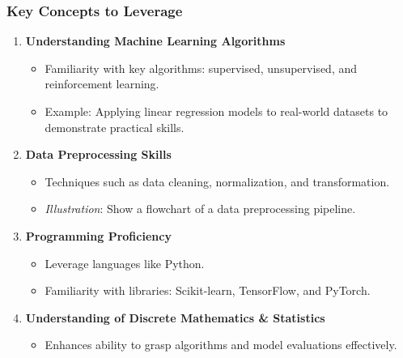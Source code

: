 \documentclass{beamer}
\begin{document}
\begin{frame}[fragile]
    \frametitle{Key Concepts to Leverage}
    \begin{enumerate}
        \item \textbf{Understanding Machine Learning Algorithms}
            \begin{itemize}
                \item Familiarity with key algorithms: supervised, unsupervised, and reinforcement learning.
                \item Example: Applying linear regression models to real-world datasets to demonstrate practical skills.
            \end{itemize}
        \item \textbf{Data Preprocessing Skills}
            \begin{itemize}
                \item Techniques such as data cleaning, normalization, and transformation.
                \item \textit{Illustration}: Show a flowchart of a data preprocessing pipeline.
            \end{itemize}
        \item \textbf{Programming Proficiency}
            \begin{itemize}
                \item Leverage languages like Python.
                \item Familiarity with libraries: Scikit-learn, TensorFlow, and PyTorch.
            \end{itemize}
        \item \textbf{Understanding of Discrete Mathematics \& Statistics}
            \begin{itemize}
                \item Enhances ability to grasp algorithms and model evaluations effectively.
            \end{itemize}
    \end{enumerate}
\end{frame}
\end{document}
